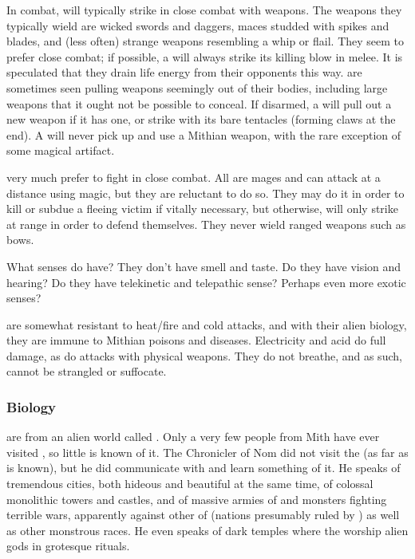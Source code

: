 In combat, \banes{} will typically strike in close combat with weapons. The weapons they typically wield are wicked swords and daggers, maces studded with spikes and blades, and (less often) strange weapons resembling a whip or flail. They seem to prefer close combat; if possible, a \bane{} will always strike its killing blow in melee. It is speculated that they drain life energy from their opponents this way. \Banes{} are sometimes seen pulling weapons seemingly out of their bodies, including large weapons that it ought not be possible to conceal. If disarmed, a \bane{} will pull out a new weapon if it has one, or strike with its bare tentacles (forming claws at the end). A \bane{} will never pick up and use a Mithian weapon, with the rare exception of some magical artifact. 

\Banes{} very much prefer to fight in close combat. All \banes{} are mages and can attack at a distance using magic, but they are reluctant to do so. They may do it in order to kill or subdue a fleeing victim if vitally necessary, but otherwise, \banes{} will only strike at range in order to defend themselves. They never wield ranged weapons such as bows. 

What senses do \banes{} have? They don't have smell and taste. Do they have vision and hearing? Do they have telekinetic and telepathic sense? Perhaps even more exotic senses? 

\Banes{} are somewhat resistant to heat/fire and cold attacks, and with their alien biology, they are immune to Mithian poisons and diseases. Electricity and acid do full damage, as do attacks with physical weapons. They do not breathe, and as such, cannot be strangled or suffocate. 

\subsubsection{Biology}
\Banes{} are from an alien world called \Erebos. Only a very few people from Mith have ever visited \Erebos, so little is known of it. The Chronicler of Nom did not visit the \Baneworld{} (as far as is known), but he did communicate with \banes{} and learn something of it. He speaks of tremendous cities, both hideous and beautiful at the same time, of colossal monolithic towers and castles, and of massive armies of \banes{} and monsters fighting terrible wars, apparently against other  of \banes{} (nations presumably ruled by \banekings) as well as other monstrous races. He even speaks of dark temples where the \banes{} worship alien gods in grotesque rituals. 

